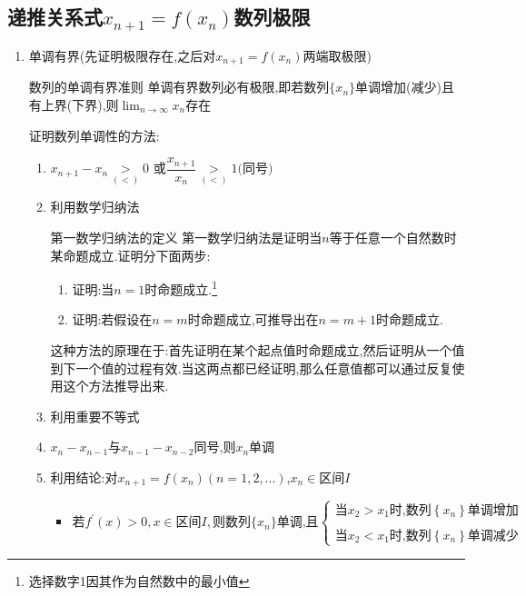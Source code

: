 \documentclass[8pt a4paper, oneside, UTF8]{ctexbook}
\begin{document}
\begin{sloppypar}
    \subsection{递推关系式\texorpdfstring{$x_{n+1}=f(x_n)$}的数列极限}
    \begin{enumerate}
        \item 单调有界(先证明极限存在,之后对$x_{n+1}=f(x_n)$两端取极限)
              \begin{them}{数列的单调有界准则}{}
                  单调有界数列必有极限,即若数列$\{x_n\}$单调增加(减少)且有上界(下界),则$\lim_{n \to \infty} x_n$存在
              \end{them}
              证明数列单调性的方法:
              \begin{enumerate}
                  \item $x_{n+1}-x_{n}\underset{(<)}{\operatorname*{>}}0\text{ 或}\dfrac{x_{n+1}}{x_{n}}\underset{(<)}{\operatorname*{>}}1\text{(同号})$
                  \item 利用数学归纳法
                        \begin{defn}{第一数学归纳法的定义}{}
                            第一数学归纳法是证明当$n$等于任意一个自然数时某命题成立.证明分下面两步:
                            \begin{enumerate}
                                \item 证明:当$n=1$时命题成立.\footnote{选择数字1因其作为自然数中的最小值}
                                \item 证明:若假设在$n=m$时命题成立,可推导出在$n=m+1$时命题成立.
                            \end{enumerate}
                            这种方法的原理在于:首先证明在某个起点值时命题成立,然后证明从一个值到下一个值的过程有效.当这两点都已经证明,那么任意值都可以通过反复使用这个方法推导出来.
                        \end{defn}
                  \item 利用重要不等式
                  \item $x_n-x_{n-1}$与$x_{n-1}-x_{n-2}$同号,则${x_n}$单调
                  \item 利用结论:对$x_{n+1}=f(x_n)(n=1,2,...)$,$x_n \in \text{区间}I$
                        \begin{itemize}
                            \item $\text{若} f^{\prime}(x) > 0, x \in \text{区间}I, \text{则数列} \{x_n\} \text{单调,且}\left\{\begin{array}{l}\text{当}x_2>x_1\text{时,数列}\left\{x_n\right\}\text{单调增加}\\\\\text{当}x_2<x_1\text{时,数列}\left\{x_n\right\}\text{单调减少}\end{array}\right.$

\end{itemize}
\end{enumerate}
\end{enumerate}
\end{sloppypar}
\end{document}
